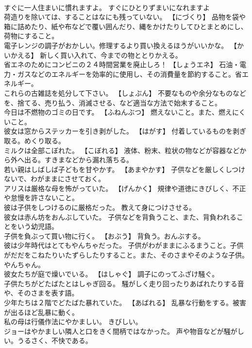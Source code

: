 \documentclass[8pt]{extreport}
\begin{document}
\begin{CJK}{UTF8}{min}
\\	すぐに一人住まいに慣れますよ。	すぐにひとりずまいになれますよ 
\\	荷造りを除いては、することはなにも残っていない。	【にづくり】 品物を袋や箱に詰めたり、紙や布などで覆い囲んだり、縄をかけたりしてひとまとめにし、荷物にすること。
\\	電子レンジの調子がおかしい。修理するより買い換えるほうがいいかな。	【かいかえる】 新しく買い入れて、今までの物ととりかえる。
\\	省エネのためにコンビニの２４時間営業を廃止しろ！	【しょうエネ】 石油・電力・ガスなどのエネルギーを効率的に使用し、その消費量を節約すること。省エネルギー。
\\	これらの古雑誌を処分して下さい。	【しょぶん】 不要なものや余分なものなどを、捨てる、売り払う、消滅させる、など適当な方法で始末すること。
\\	今日は不燃物のゴミの日です。	【ふねんぶつ】 燃えないこと。また、燃えにくいこと。
\\	彼女は窓からステッカーを引き剥がした。	【はがす】 付着しているものを剥ぎ取る。めくり取る。
\\	ミルクは全部こぼれた。	【こぼれる】 液体、粉末、粒状の物などが容器などから外へ出る。すきまなどから漏れ落ちる。
\\	若い親はしばしば子どもを甘やかす。	【あまやかす】 子供などを厳しくしつけないで、わがままにさせておく。
\\	アリスは厳格な母を怖がっていた。	【げんかく】 規律や道徳にきびしく、不正や怠慢を許さないこと。
\\	彼は子供をしつけるのに厳格だった。	教えて身につけさせる。
\\	彼女は赤ん坊をおんぶしていた。	子供などを背負うこと、また、背負われることをいう幼児語。
\\	子供を負ぶって買い物に行く。	【おぶう】 背負う。おんぶする。
\\	彼は少年時代はとてもやんちゃだった。	子供がわがままにふるまうこと。子供がだだをこねたりいたずらしたりすること。また、そのさまやそのような子供。やんちゃん。
\\	彼女たちが庭で燥いでいる。	【はしゃぐ】 調子にのってふざけ騒ぐ。
\\	子供たちがどたばたとはしゃぎ回る。	騒がしく走り回ったりあばれたりする音や、そのさまを表す語。
\\	少年たちは２階でどたばた暴れていた。	【あばれる】 乱暴な行動をする。被害が出るほど乱暴に動く。
\\	私の母は行儀作法にやかましい。	きびしい。
\\	ジョーはやかましい隣人と口をきく間柄ではなかった。	声や物音などが騒がしい。うるさく、不快である。

\end{CJK}
\end{document}
